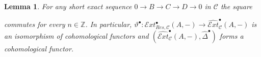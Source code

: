 \documentclass[12pt,a4paper]{article}
\numberwithin{equation}{section}
\newtheorem{lem}[thm]{Lemma}
\theoremstyle{nonumberplain}
\begin{document}
\begin{lem}\label{lem:hyperresol}
For any short exact sequence $0 \rightarrow B \rightarrow C \rightarrow D \rightarrow 0$ in $\mathcal{C}$ the square
\begin{center}
\end{center}
commutes for every $n \in \mathbb{Z}$. In particular, $\vartheta^{\bullet}: \mathcal{E}xt_{Res, \mathcal{C}}^{\bullet}(A, -) \rightarrow \widehat{\mathcal{E}xt}_{\mathcal{C}}^{\bullet}(A, -)$ is an isomorphism of cohomological functors and $(\widehat{\mathcal{E}xt}_{\mathcal{C}}^{\bullet}(A, -), \widehat{\Delta}^{\bullet})$ forms a cohomological functor.
\end{lem}
\end{document}
